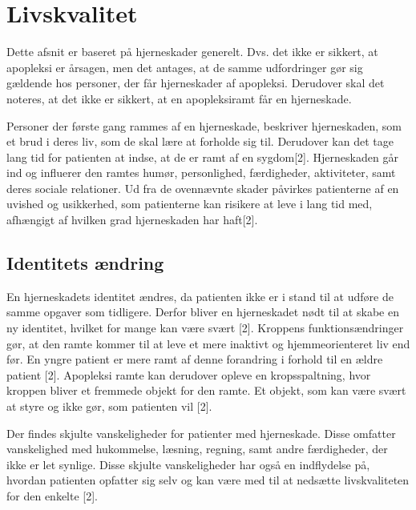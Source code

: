 \section{Livskvalitet}
Dette afsnit er baseret på hjerneskader generelt. Dvs. det ikke er sikkert, at apopleksi er årsagen, men det antages, at de samme udfordringer gør sig gældende hos personer, der får hjerneskader af apopleksi. Derudover skal det noteres, at det ikke er sikkert, at en apopleksiramt får en hjerneskade. 

Personer der første gang rammes af en hjerneskade, beskriver hjerneskaden, som et brud i deres liv, som de skal lære at forholde sig til. Derudover kan det tage lang tid for patienten at indse, at de er ramt af en sygdom[2]. 
Hjerneskaden går ind og influerer den ramtes humør, personlighed, færdigheder, aktiviteter, samt deres sociale relationer. Ud fra de ovennævnte skader påvirkes patienterne af  en uvished og usikkerhed, som patienterne kan risikere at leve i lang tid med, afhængigt af hvilken grad hjerneskaden har haft[2]. 

\subsection{Identitets ændring}
En hjerneskadets identitet ændres, da patienten ikke er i stand til at udføre de samme opgaver som tidligere. Derfor bliver en hjerneskadet nødt til at skabe en ny identitet, hvilket for mange kan være svært [2]. Kroppens funktionsændringer gør, at den ramte kommer til at leve et mere inaktivt og hjemmeorienteret liv end før. En yngre patient er mere ramt af denne forandring i forhold til en ældre patient [2]. Apopleksi ramte kan derudover opleve en kropsspaltning, hvor kroppen bliver et fremmede objekt for den ramte. Et objekt, som kan være svært at styre og ikke gør, som patienten vil [2]. 

Der findes skjulte vanskeligheder for patienter med hjerneskade. Disse omfatter vanskelighed med hukommelse, læsning, regning, samt andre færdigheder, der ikke er let synlige. Disse skjulte vanskeligheder har også en indflydelse på, hvordan patienten opfatter sig selv og kan være med til at nedsætte livskvaliteten for den enkelte [2]. 

